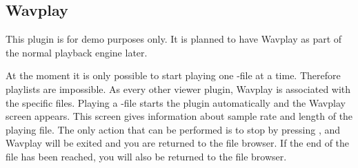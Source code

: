 \subsection{Wavplay}
This plugin is for demo purposes only. It is planned to have 
Wavplay as part of the normal playback engine later.

At the moment it is only possible to start playing one -file at a 
time. Therefore playlists are impossible. As every other viewer plugin, Wavplay
is associated with the specific files. Playing a -file starts the 
plugin automatically and the Wavplay screen 
appears. This screen gives information about sample rate and length of the 
playing file. 
The only action that can be performed is to stop by pressing \ButtonOff, and 
Wavplay will be exited and you are returned to the  file browser. If the end of 
the file has been reached, you will also be returned to the file browser.
